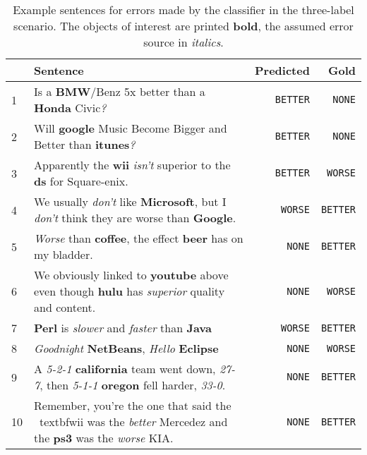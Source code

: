\begin{table}[h]
\caption{Example sentences for errors made by the classifier in the three-label scenario. The objects of interest are printed \textbf{bold}, the assumed error source in \emph{italics}.}
\label{tbl:3_mistakes}
\begin{tabularx}{\linewidth}{lXrr}
\toprule
 & Sentence & Predicted & Gold \\ \midrule
1 & Is a \textbf{BMW}/Benz 5x better than a \textbf{Honda} Civic\emph{?} & \texttt{BETTER} & \texttt{NONE} \\
2 & Will \textbf{google} Music Become Bigger and Better than \textbf{itunes}\emph{?}& \texttt{BETTER} & \texttt{NONE} \\

3 & Apparently the \textbf{wii} \emph{isn't} superior to the \textbf{ds} for Square-enix. & \texttt{BETTER} & \texttt{WORSE} \\
4 & We usually \emph{don't} like \textbf{Microsoft}, but I \emph{don't} think they are worse than \textbf{Google}. & \texttt{WORSE} & \texttt{BETTER} \\

5 & \emph{Worse} than \textbf{coffee}, the effect \textbf{beer} has on my bladder. & \texttt{NONE} & \texttt{BETTER} \\
6 & We obviously linked to \textbf{youtube} above even though \textbf{hulu} has \emph{superior} quality and content.  & \texttt{NONE} & \texttt{WORSE} \\

7 & \textbf{Perl} is \emph{slower} and \emph{faster} than \textbf{Java} & \texttt{WORSE} & \texttt{BETTER} \\

8 & \emph{Goodnight} \textbf{NetBeans}, \emph{Hello} \textbf{Eclipse} & \texttt{NONE} & \texttt{WORSE} \\

9 & A \emph{5-2-1} \textbf{california} team went down, \emph{27-7}, then \emph{5-1-1} \textbf{oregon} fell harder, \emph{33-0}. & \texttt{NONE} & \texttt{BETTER} \\

10 & Remember, you're the one that said the \ textbf{wii} was the \emph{better} Mercedez and the \textbf{ps3} was the \emph{worse} KIA. & \texttt{NONE} & \texttt{BETTER} \\


\bottomrule
\end{tabularx}

\end{table}

